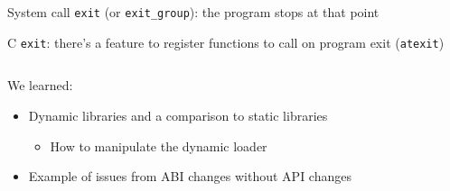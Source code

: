 \begin{slide}
  

  System call \texttt{exit} (or \texttt{exit\_group}): the program
  stops at that point
  \medskip

  C \texttt{exit}: there's a feature to register functions to call
  on program exit (\texttt{atexit})
  \medskip

  \inputminted{c}{atexit-example.c}
\end{slide}

\begin{slide}
  

  We learned:
  \begin{itemize}
    \item Dynamic libraries and a comparison to static libraries
    \begin{itemize}
      \item How to manipulate the dynamic loader
    \end{itemize}
    \item Example of issues from ABI changes without API changes
  \end{itemize}

\end{slide}


  

